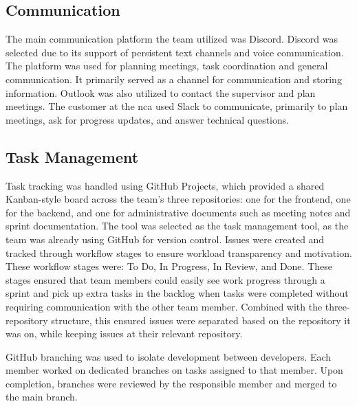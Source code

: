 
\subsection{Communication}
The main communication platform the team utilized was Discord. Discord was selected due to its support of persistent text channels and voice communication. The platform was used for planning meetings, task coordination and general communication. It primarily served as a channel for communication and storing information. Outlook was also utilized to contact the supervisor and plan meetings. The customer at the \acrshort{nca} used Slack to communicate, primarily to plan meetings, ask for progress updates, and answer technical questions.

\subsection{Task Management}
\label{sec:task_management}

Task tracking was handled using GitHub Projects, which provided a shared Kanban-style board across the team's three repositories: one for the frontend, one for the backend, and one for administrative documents such as meeting notes and sprint documentation. The tool was selected as the task management tool, as the team was already using GitHub for version control. Issues were created and tracked through workflow stages to ensure workload transparency and motivation. These workflow stages were: To Do, In Progress, In Review, and Done. These stages ensured that team members could easily see work progress through a sprint and pick up extra tasks in the backlog when tasks were completed without requiring communication with the other team member. Combined with the three-repository structure, this ensured issues were separated based on the repository it was on, while keeping issues at their relevant repository.


GitHub branching was used to isolate development between developers. Each member worked on dedicated branches on tasks assigned to that member. Upon completion, branches were reviewed by the responsible member and merged to the main branch. 

